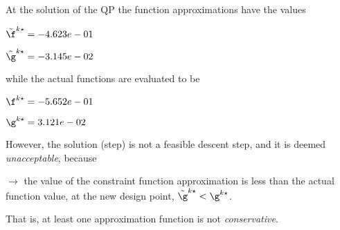 At the solution of the QP the function approximations have the values

$\tilde \f^{k\star} = -4.623e-01$

$\tilde \g^{k\star} = -3.145e-02$

\bigskip
while the actual functions are evaluated to be

$\f^{k\star} = -5.652e-01$

$\g^{k\star} =  3.121e-02$

\bigskip
 However, the solution (step)                         is not a feasible descent step, and it is deemed                         \emph{unacceptable}, because 
 


 $\to$ the value of the constraint function                             approximation is less than the actual function value, at                             the new design point, $\tilde {\g}^{k\star} < {\g}^{k\star}$.

 \bigskip 

 That is, at least one approximation                         function is not \emph{conservative}.
